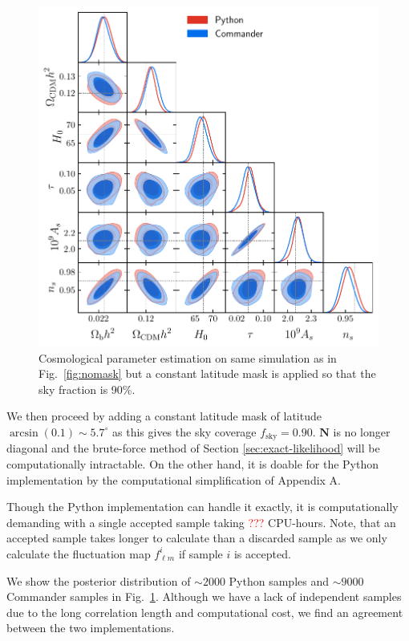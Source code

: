 \documentclass[twocolumn]{../common/aa}
\begin{document}
\begin{figure}
	\centering
	\includegraphics[width=\linewidth]{figures/dist_posterior_10_mask.pdf}
	\caption{\label{fig:mask10}Cosmological parameter estimation on same simulation as in Fig.~\ref{fig:nomask} but a constant latitude mask is applied so that the sky fraction is 90\%.}
\end{figure}

We then proceed by adding a constant latitude mask of latitude $\arcsin(0.1) \sim 5.7^\circ$ as this gives the sky coverage $f_{\mathrm{sky}} = 0.90$. $\textbf{N}$ is no longer diagonal and the brute-force method of Section \ref{sec:exact-likelihood} will be computationally intractable. On the other hand, it is doable for the Python implementation by the computational simplification of Appendix A.

Though the Python implementation can handle it exactly, it is computationally demanding with a single accepted sample taking \textcolor{red}{???} CPU-hours. Note, that an accepted sample takes longer to calculate than a discarded sample as we only calculate the fluctuation map $f^i_{\ell m}$ if sample $i$ is accepted.

We show the posterior distribution of $\sim 2000$ Python samples and $\sim 9000$ Commander samples in Fig.~\ref{fig:mask10}. Although we have a lack of independent samples due to the long correlation length and computational cost, we find an agreement between the two implementations.
\end{document}
